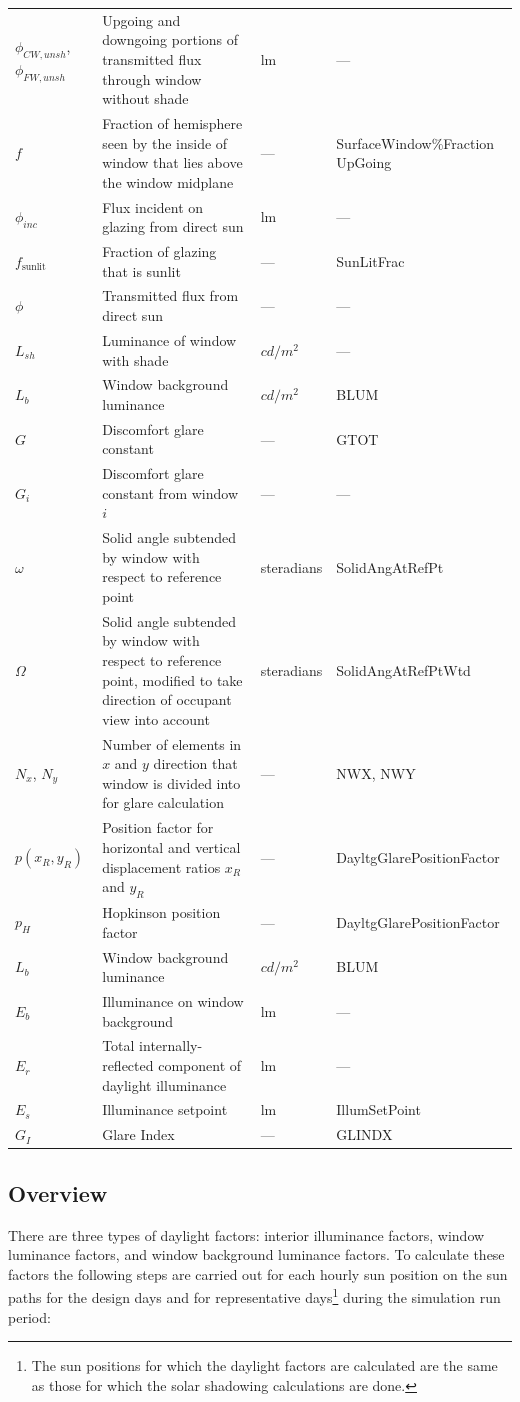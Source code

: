 \begin{longtable}[c]{p{1.25in}p{2.0in}p{1.25in}p{1.5in}}
$\phi_{CW,unsh}$, $\phi_{FW,unsh}$ & Upgoing and downgoing portions of transmitted flux through window without shade & lm & --- \tabularnewline
$f$ & Fraction of hemisphere seen by the inside of window that lies above the window midplane & --- & SurfaceWindow\%Fraction UpGoing \tabularnewline
$\phi_{inc}$ & Flux incident on glazing from direct sun & lm & --- \tabularnewline
$f_{\text{sunlit}}$ & Fraction of glazing that is sunlit & --- & SunLitFrac \tabularnewline
$\phi$ & Transmitted flux from direct sun & --- & --- \tabularnewline
$L_{sh}$ & Luminance of window with shade & $cd/m^2$ & --- \tabularnewline
$L_b$ & Window background luminance & $cd/m^2$ & BLUM \tabularnewline
$G$ & Discomfort glare constant & --- & GTOT \tabularnewline
$G_i$ & Discomfort glare constant from window $i$ & --- & --- \tabularnewline
$\omega$ & Solid angle subtended by window with respect to reference point & steradians & SolidAngAtRefPt \tabularnewline
$\Omega$ & Solid angle subtended by window with respect to reference point, modified to take direction of occupant view into account & steradians & SolidAngAtRefPtWtd \tabularnewline
$N_x$, $N_y$ & Number of elements in $x$ and $y$ direction that window is divided into for glare calculation & --- & NWX, NWY \tabularnewline
$p(x_R, y_R)$ & Position factor for horizontal and vertical displacement ratios $x_R$ and $y_R$ & --- & DayltgGlarePositionFactor \tabularnewline
$p_H$ & Hopkinson position factor & --- & DayltgGlarePositionFactor \tabularnewline
$L_b$ & Window background luminance & $cd/m^2$ & BLUM \tabularnewline
$E_b$ & Illuminance on window background & lm & --- \tabularnewline
$E_r$ & Total internally-reflected component of daylight illuminance & lm & --- \tabularnewline
$E_s$ & Illuminance setpoint & lm & IllumSetPoint \tabularnewline
$G_I$ & Glare Index & --- & GLINDX \tabularnewline
\bottomrule
\end{longtable}

\subsection{Overview}\label{overview-013}

There are three types of daylight factors: interior illuminance factors, window luminance factors, and window background luminance factors. To calculate these factors the following steps are carried out for each hourly sun position on the sun paths for the design days and for representative days\footnote{The sun positions for which the daylight factors are calculated are the same as those for which the solar shadowing calculations are done.} during the simulation run period:

